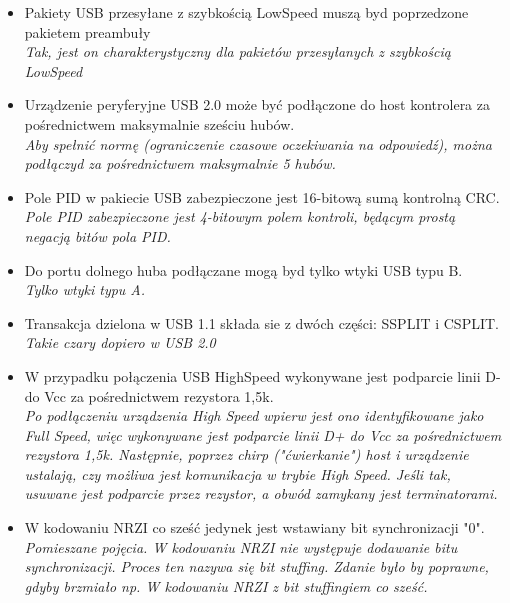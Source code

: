 \begin{itemize}
	\item \textcolor{tak}{Pakiety USB przesyłane z szybkością LowSpeed muszą byd poprzedzone pakietem preambuły} \\
	{\small \emph{Tak, jest on charakterystyczny dla pakietów przesyłanych z szybkością LowSpeed}}
	
	\item \textcolor{nie}{Urządzenie peryferyjne USB 2.0 może być podłączone do host kontrolera za pośrednictwem maksymalnie sześciu hubów.} \\
	{\small \emph{Aby spełnić normę (ograniczenie czasowe oczekiwania na odpowiedź), można podłączyd za pośrednictwem maksymalnie 5 hubów.}}
	
	\item \textcolor{nie}{Pole PID w pakiecie USB zabezpieczone jest 16-bitową sumą kontrolną CRC.} \\
	{\small \emph{Pole PID zabezpieczone jest 4-bitowym polem kontroli, będącym prostą negacją bitów pola PID.}}
	
	\item \textcolor{nie}{Do portu dolnego huba podłączane mogą byd tylko wtyki USB typu B.} \\
	{\small \emph{Tylko wtyki typu A.}}
	
	\item \textcolor{nie}{Transakcja dzielona w USB 1.1 składa sie z dwóch części: SSPLIT i CSPLIT.} \\
	{\small \emph{Takie czary dopiero w USB 2.0}}
	
	\item \textcolor{nie}{W przypadku połączenia USB HighSpeed wykonywane jest podparcie linii D- do Vcc za pośrednictwem rezystora 1,5k.} \\
	{\small \emph{Po podłączeniu urządzenia High Speed wpierw jest ono identyfikowane jako Full Speed, więc wykonywane jest podparcie linii D+ do Vcc za pośrednictwem rezystora 1,5k. Następnie, poprzez chirp ("ćwierkanie") host i urządzenie ustalają, czy możliwa jest komunikacja w trybie High Speed. Jeśli tak, usuwane jest podparcie przez rezystor, a obwód zamykany jest terminatorami.}}
	
	\item \textcolor{nie}{W kodowaniu NRZI co sześć jedynek jest wstawiany bit synchronizacji "0".} \\
	{\small \emph{Pomieszane pojęcia. W kodowaniu NRZI nie występuje dodawanie bitu synchronizacji. Proces ten nazywa się bit stuffing. Zdanie było by poprawne, gdyby brzmiało np. W kodowaniu NRZI z bit stuffingiem co sześć.}}
	

\end{itemize}
